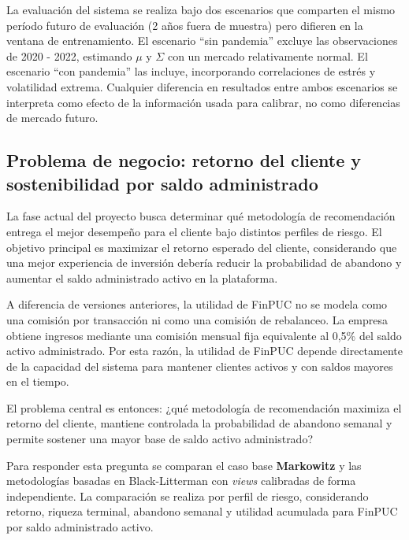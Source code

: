 La evaluaci\'on del sistema se realiza bajo dos escenarios que comparten el
mismo per\'iodo futuro de evaluaci\'on (2 a\~nos fuera de muestra) pero
difieren en la ventana de entrenamiento. El escenario ``sin pandemia'' excluye
las observaciones de 2020 - 2022, estimando $\mu$ y $\Sigma$ con un mercado
relativamente normal. El escenario ``con pandemia'' las incluye, incorporando
correlaciones de estr\'es y volatilidad extrema. Cualquier diferencia en
resultados entre ambos escenarios se interpreta como efecto de la
informaci\'on usada para calibrar, no como diferencias de mercado futuro.

\subsection{Problema de negocio: retorno del cliente y sostenibilidad por saldo administrado}\label{sec:problema_negocio}

La fase actual del proyecto busca determinar qu\'e metodolog\'ia de
recomendaci\'on entrega el mejor desempe\~no para el cliente bajo distintos
perfiles de riesgo. El objetivo principal es maximizar el retorno esperado del
cliente, considerando que una mejor experiencia de inversi\'on deber\'ia reducir
la probabilidad de abandono y aumentar el saldo administrado activo en la
plataforma.

A diferencia de versiones anteriores, la utilidad de FinPUC no se modela como
una comisi\'on por transacci\'on ni como una comisi\'on de rebalanceo. La empresa
obtiene ingresos mediante una comisi\'on mensual fija equivalente al 0,5\% del
saldo activo administrado. Por esta raz\'on, la utilidad de FinPUC depende
directamente de la capacidad del sistema para mantener clientes activos y con
saldos mayores en el tiempo.

El problema central es entonces: ¿qu\'e metodolog\'ia de recomendaci\'on
maximiza el retorno del cliente, mantiene controlada la probabilidad de abandono
semanal y permite sostener una mayor base de saldo activo administrado?

Para responder esta pregunta se comparan el caso base \textbf{Markowitz} y las
metodolog\'ias basadas en Black-Litterman con \textit{views} calibradas de forma
independiente. La comparaci\'on se realiza por perfil de riesgo, considerando
retorno, riqueza terminal, abandono semanal y utilidad acumulada para FinPUC por
saldo administrado activo.
